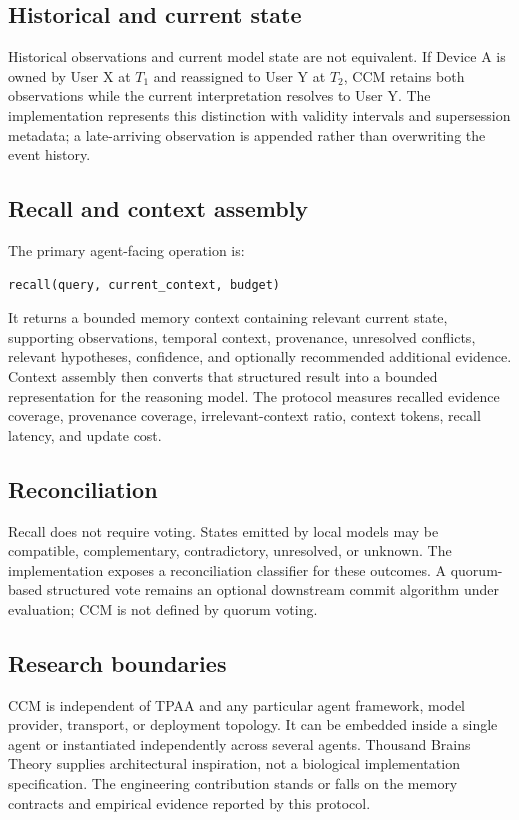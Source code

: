 \subsection{Historical and current state}

Historical observations and current model state are not equivalent. If Device A is owned by User X at $T_1$ and reassigned to User Y at $T_2$, CCM retains both observations while the current interpretation resolves to User Y. The implementation represents this distinction with validity intervals and supersession metadata; a late-arriving observation is appended rather than overwriting the event history.

\subsection{Recall and context assembly}

The primary agent-facing operation is:

\begin{verbatim}
recall(query, current_context, budget)
\end{verbatim}

It returns a bounded memory context containing relevant current state, supporting observations, temporal context, provenance, unresolved conflicts, relevant hypotheses, confidence, and optionally recommended additional evidence. Context assembly then converts that structured result into a bounded representation for the reasoning model. The protocol measures recalled evidence coverage, provenance coverage, irrelevant-context ratio, context tokens, recall latency, and update cost.

\subsection{Reconciliation}

Recall does not require voting. States emitted by local models may be compatible, complementary, contradictory, unresolved, or unknown. The implementation exposes a reconciliation classifier for these outcomes. A quorum-based structured vote remains an optional downstream commit algorithm under evaluation; CCM is not defined by quorum voting.

\subsection{Research boundaries}

CCM is independent of TPAA and any particular agent framework, model provider, transport, or deployment topology. It can be embedded inside a single agent or instantiated independently across several agents. Thousand Brains Theory supplies architectural inspiration, not a biological implementation specification. The engineering contribution stands or falls on the memory contracts and empirical evidence reported by this protocol.
